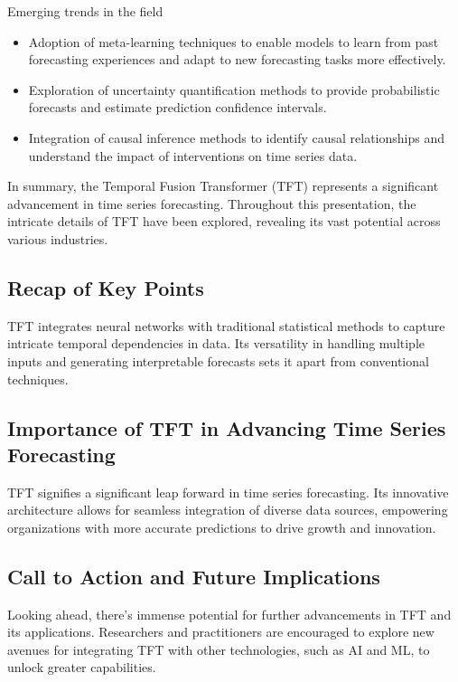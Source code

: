 			\begin{frame}{Emerging trends in the field}
				\begin{itemize}
					\item Adoption of meta-learning techniques to enable models to learn from past forecasting experiences and adapt to new forecasting tasks more effectively.
					\item Exploration of uncertainty quantification methods to provide probabilistic forecasts and estimate prediction confidence intervals.
					\item Integration of causal inference methods to identify causal relationships and understand the impact of interventions on time series data.
				\end{itemize}
					\end{frame}
					
\begin{frame}
In summary, the Temporal Fusion Transformer (TFT) represents a significant advancement in time series forecasting. Throughout this presentation, the intricate details of TFT have been explored, revealing its vast potential across various industries.

\subsection*{Recap of Key Points}

TFT integrates neural networks with traditional statistical methods to capture intricate temporal dependencies in data. Its versatility in handling multiple inputs and generating interpretable forecasts sets it apart from conventional techniques.

\subsection*{Importance of TFT in Advancing Time Series Forecasting}

TFT signifies a significant leap forward in time series forecasting. Its innovative architecture allows for seamless integration of diverse data sources, empowering organizations with more accurate predictions to drive growth and innovation.

\subsection*{Call to Action and Future Implications}

Looking ahead, there's immense potential for further advancements in TFT and its applications. Researchers and practitioners are encouraged to explore new avenues for integrating TFT with other technologies, such as AI and ML, to unlock greater capabilities.
\end{frame}

